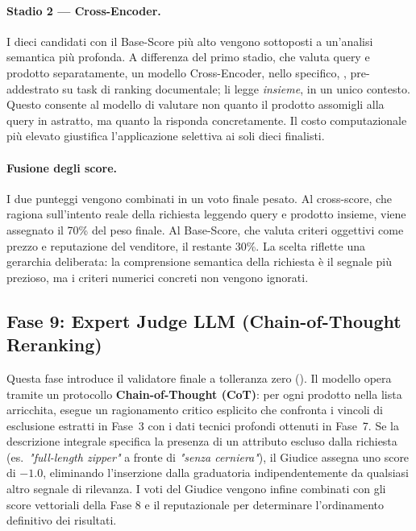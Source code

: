 \paragraph{Stadio 2 — Cross-Encoder.}
I dieci candidati con il Base-Score più alto vengono sottoposti a
un'analisi semantica più profonda. A differenza del primo stadio,
che valuta query e prodotto separatamente, un modello Cross-Encoder,
nello specifico, , pre-addestrato
su task di ranking documentale; li legge \emph{insieme}, in un
unico contesto. Questo consente al modello di valutare non quanto
il prodotto assomigli alla query in astratto, ma quanto la risponda
concretamente. Il costo computazionale più elevato giustifica
l'applicazione selettiva ai soli dieci finalisti.

\paragraph{Fusione degli score.}
I due punteggi vengono combinati in un voto finale pesato.
Al cross-score, che ragiona sull'intento reale della
richiesta leggendo query e prodotto insieme, viene assegnato
il 70\% del peso finale. Al Base-Score, che valuta
criteri oggettivi come prezzo e reputazione del venditore,
il restante 30\%. La scelta riflette una gerarchia
deliberata: la comprensione semantica della richiesta è il
segnale più prezioso, ma i criteri numerici concreti non
vengono ignorati.

\subsection*{Fase 9: Expert Judge LLM (Chain-of-Thought Reranking)}
Questa fase introduce il validatore finale a tolleranza zero ().
Il modello opera tramite un protocollo \textbf{Chain-of-Thought (CoT)}: per
ogni prodotto nella lista arricchita, esegue un ragionamento critico
esplicito che confronta i vincoli di esclusione estratti in Fase~3 con i
dati tecnici profondi ottenuti in Fase~7. Se la descrizione integrale
specifica la presenza di un attributo escluso dalla richiesta
(es.\ \emph{"full-length zipper"} a fronte di \emph{"senza cerniera"}),
il Giudice assegna uno score di \(-1.0\), eliminando l'inserzione dalla
graduatoria indipendentemente da qualsiasi altro segnale di rilevanza.
I voti del Giudice vengono infine combinati con gli score vettoriali della
Fase 8 e il  reputazionale per determinare l'ordinamento
definitivo dei risultati.

